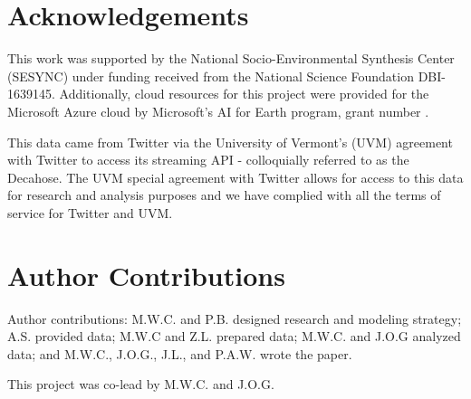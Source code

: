 \documentclass{article}
\begin{document}
\section{Acknowledgements}
This work was supported by the National Socio-Environmental Synthesis Center (SESYNC) under funding received from the National Science Foundation DBI-1639145.  Additionally, cloud resources for this project were provided for the Microsoft Azure cloud by Microsoft's AI for Earth program, grant number .

This data came from Twitter via the University of Vermont’s (UVM) agreement with Twitter to access its streaming API - colloquially referred to as the Decahose.  The UVM special agreement with Twitter allows for access to this data for research and analysis purposes and we have complied with all the terms of service for Twitter and UVM. 
\printbibliography

\section{Author Contributions}
Author contributions: M.W.C. and P.B. designed research and modeling strategy; A.S. provided data; M.W.C and Z.L. prepared data; M.W.C. and J.O.G analyzed data; and M.W.C., J.O.G., J.L., and P.A.W. wrote the paper.

This project was co-lead by M.W.C. and J.O.G.
\end{document}
